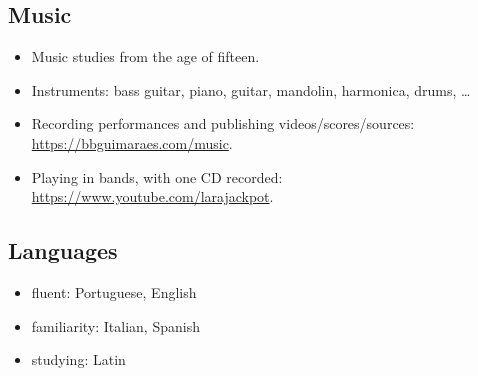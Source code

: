\subsection*{Music}

\begin{itemize}
    \item Music studies from the age of fifteen.
    \item
        Instruments: bass guitar, piano, guitar, mandolin, harmonica, drums, …
    \item
        Recording performances and publishing videos/scores/sources:
        \url{https://bbguimaraes.com/music}.
    \item
        Playing in bands, with one CD recorded:
        \url{https://www.youtube.com/larajackpot}.
\end{itemize}

\subsection*{Languages}

\begin{itemize}
    \item fluent: Portuguese, English
    \item familiarity: Italian, Spanish
    \item studying: Latin
\end{itemize}
